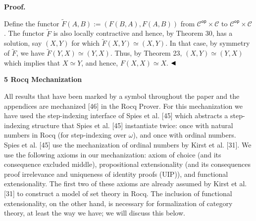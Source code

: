 \documentclass[10pt,a4paper]{article}
\begin{document}
 
\par\medskip\noindent\textbf{Proof.}\par
 
 
Define the functor $\tilde{F}(A,B):=(F(B,A),F(A,B))$ from ${\mathcal{C}}^{\mathsf{op}}\times\mathcal{C}$ to ${\mathcal{C}}^{\mathsf{op}}\times\mathcal{C}$. The functor $\tilde{F}$ is also locally contractive and hence, by Theorem 30, has a solution, say $(X,Y)$ for which $\tilde{F}(X,Y)\simeq(X,Y)$. In that case, by symmetry of $\tilde{F}$, we have $\tilde{F}(Y,X)\simeq(Y,X)$. Thus, by Theorem 23, $(X,Y)\simeq(Y,X)$ which implies that $X\simeq Y$, and hence, $F(X,X)\simeq X$. $\hfill\blacktriangleleft$\par
 
 
 
 


 
\par\medskip\noindent\textbf{5 Rocq Mechanization}\par
 
 
All results that have been marked by a  symbol throughout the paper and the appendices are mechanized [46] in the Rocq Prover. For this mechanization we have used the step-indexing interface of Spies et al. [45] which abstracts a step-indexing structure that Spies et al. [45] instantiate twice: once with natural numbers in Rocq (for step-indexing over $\omega$), and once with ordinal numbers. Spies et al. [45] use the mechanization of ordinal numbers by Kirst et al. [31]. We use the following axioms in our mechanization: axiom of choice (and its consequence excluded middle), propositional extensionality (and its consequences proof irrelevance and uniqueness of identity proofs (UIP)), and functional extensionality. The first two of these axioms are already assumed by Kirst et al. [31] to construct a model of set theory in Rocq. The inclusion of functional extensionality, on the other hand, is necessary for formalization of category theory, at least the way we have; we will discuss this below.\par
 
 
 
\end{document}
